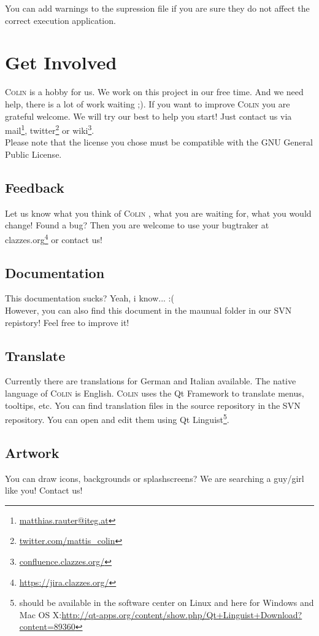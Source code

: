 \documentclass[a4paper,11pt]{report}
\newcommand{\Colin}[0]{\textsc{Colin }}
\begin{document}
You can add warnings to the supression file if you are sure they do not affect the correct execution application.



\chapter{Get Involved}
\label{cha:involved}

\Colin is a hobby for us. We work on this project in our free time. And we need help, there is a lot of work waiting ;). If you want to improve \Colin you are grateful welcome. We will try our best to help you start! Just contact us via mail\footnote{\href{mailto:matthias.rauter@iteg.at}{matthias.rauter@iteg.at}}, twitter\footnote{\url{twitter.com/mattis_colin}} or wiki\footnote{\url{confluence.clazzes.org/}}.\\
Please note that the license you chose must be compatible with the GNU General Public License.


\section{Feedback}
Let us know what you think of \Colin, what you are waiting for, what you would change! Found a bug?
Then you are welcome to use your bugtraker at clazzes.org\footnote{\url{https://jira.clazzes.org/}} or contact us!

\section{Documentation}
This documentation sucks? Yeah, i know... :(\\
However, you can also find this document in the maunual folder in our SVN repistory! Feel free to improve it!

\section{Translate}
Currently there are translations for German and Italian available. The native language of \Colin is English.
\Colin uses the Qt Framework to translate menus, tooltips, etc. You can find translation files in the source repository in the SVN repository. You can open and edit them using Qt Linguist\footnote{should be available in the software center on Linux and here for Windows and Mac OS X:\url{http://qt-apps.org/content/show.php/Qt+Linguist+Download?content=89360}}.

\section{Artwork}
You can draw icons, backgrounds or splashscreens? We are searching a guy/girl like you! Contact us!
\end{document}
